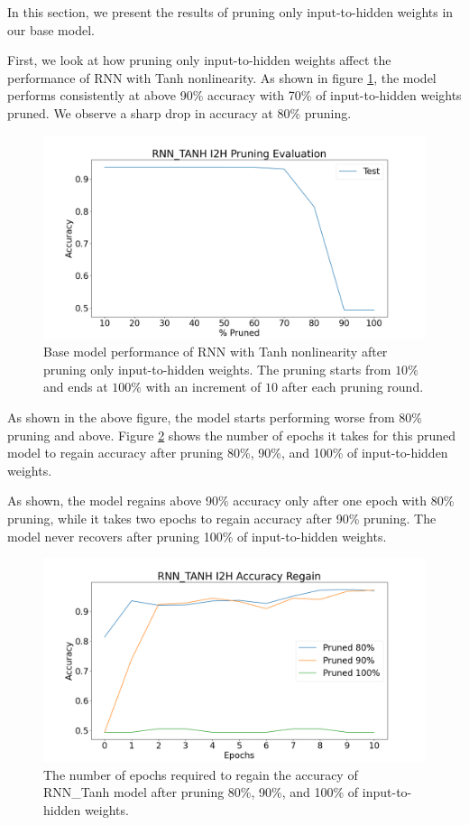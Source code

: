 In this section, we present the results of pruning only input-to-hidden weights in our base model.

First, we look at how pruning only input-to-hidden weights affect the performance of RNN with Tanh nonlinearity. As shown in figure \ref{fig:rnn_tanh_i2h_prune}, the model performs consistently at above 90\% accuracy with 70\% of input-to-hidden weights pruned. We observe a sharp drop in accuracy at 80\% pruning.

\begin{figure}[h]
	\centering
	\includegraphics[width=0.8\linewidth]{images/results/pruning_i2h/rnn_tanh_i2h_pruning_evaluation.png}
	\caption[RNN\_Tanh base model performance after pruning i2h weights]%
	{Base model performance of RNN with Tanh nonlinearity after pruning only input-to-hidden weights. The pruning starts from $10\%$ and ends at $100\%$ with an increment of $10$ after each pruning round.}
	\label{fig:rnn_tanh_i2h_prune}
\end{figure}

As shown in the above figure, the model starts performing worse from 80\% pruning and above. Figure \ref{fig:rnn_tanh_i2h_prune_regain} shows the number of epochs it takes for this pruned model to regain accuracy after pruning 80\%, 90\%, and 100\% of input-to-hidden weights.

As shown, the model regains above 90\% accuracy only after one epoch with 80\% pruning, while it takes two epochs to regain accuracy after 90\% pruning. The model never recovers after pruning 100\% of input-to-hidden weights.

\begin{figure}[h]
	\centering
	\includegraphics[width=0.8\linewidth]{images/results/pruning_i2h/rnn_tanh_i2h_accuracy_regain.png}
	\caption[RNN\_Tanh base model performance regain after pruning i2h weights]%
	{The number of epochs required to regain the accuracy of RNN\_Tanh model after pruning 80\%, 90\%, and 100\% of input-to-hidden weights.}
	\label{fig:rnn_tanh_i2h_prune_regain}
\end{figure}


